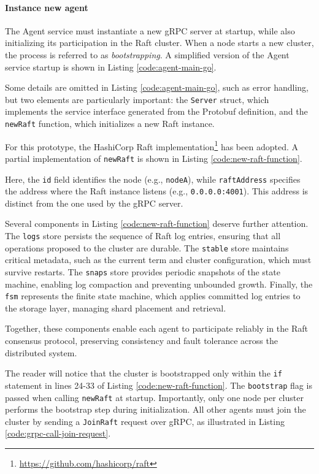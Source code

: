 \paragraph{Instance new agent}

The Agent service must instantiate a new gRPC server at startup, while also initializing its participation in the Raft cluster. When a node starts a new cluster, the process is referred to as \emph{bootstrapping}. A simplified version of the Agent service startup is shown in Listing \ref{code:agent-main-go}.

Some details are omitted in Listing \ref{code:agent-main-go}, such as error handling, but two elements are particularly important:
the \texttt{Server} struct, which implements the service interface generated from the Protobuf definition, and the \texttt{newRaft} function, which initializes a new Raft instance.  

For this prototype, the HashiCorp Raft implementation\footnote{\url{https://github.com/hashicorp/raft}} has been adopted. A partial implementation of \texttt{newRaft} is shown in Listing \ref{code:new-raft-function}.

Here, the \texttt{id} field identifies the node (e.g., \texttt{nodeA}), while \texttt{raftAddress} specifies the address where the Raft instance listens (e.g., \texttt{0.0.0.0:4001}). This address is distinct from the one used by the gRPC server.

Several components in Listing \ref{code:new-raft-function} deserve further attention.  
The \texttt{logs} store persists the sequence of Raft log entries, ensuring that all operations proposed to the cluster are durable. The \texttt{stable} store maintains critical metadata, such as the current term and cluster configuration, which must survive restarts. The \texttt{snaps} store provides periodic snapshots of the state machine, enabling log compaction and preventing unbounded growth. Finally, the \texttt{fsm} represents the finite state machine, which applies committed log entries to the storage layer, managing shard placement and retrieval.  

Together, these components enable each agent to participate reliably in the Raft consensus protocol, preserving consistency and fault tolerance across the distributed system.

The reader will notice that the cluster is bootstrapped only within the \texttt{if} statement in lines 24-33 of Listing \ref{code:new-raft-function}. The \texttt{bootstrap} flag is passed when calling \texttt{newRaft} at startup. Importantly, only one node per cluster performs the bootstrap step during initialization. All other agents must join the cluster by sending a \texttt{JoinRaft} request over gRPC, as illustrated in Listing \ref{code:grpc-call-join-request}.

